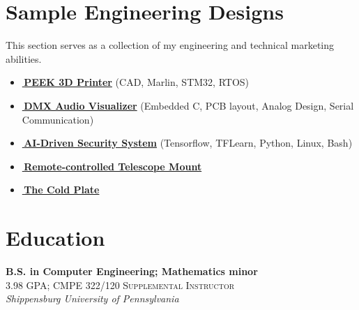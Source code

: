 \documentclass[
	12pt, %
]{FreemanCV}
\begin{document}

\vspace*{-10pt}
\section{Sample Engineering Designs}
{
	This section serves as a collection of my engineering and technical marketing abilities.
	\vspace*{-7pt}
	\begin{itemize}[leftmargin=10pt]
		\itemsep-5pt
		\item \href{https://github.com/jfcbooth/3dpp}{\linkcolor\scriptsize\faLink\normalcolor\normalsize\,\textbf{PEEK 3D Printer}} (CAD, Marlin, STM32, RTOS)
		\item \href{https://github.com/microchip-pic-avr-examples/pic16f56q71-audio-light-show-mplab-mcc}{\linkcolor\scriptsize\faLink\normalcolor\normalsize\,\textbf{DMX Audio Visualizer}} (Embedded C, PCB layout, Analog Design, Serial Communication)
		\item \href{https://github.com/jfcbooth/security_system}{\linkcolor\scriptsize\faLink\normalcolor\normalsize\,\textbf{AI-Driven Security System}} (Tensorflow, TFLearn, Python, Linux, Bash)
		\item \href{https://github.com/jfcbooth/hadley_electric_stand}{\linkcolor\scriptsize\faLink\normalcolor\normalsize\,\textbf{Remote-controlled Telescope Mount}}
		\item \href{https://github.com/microchip-pic-avr-examples/pic16f17146-cold-plate-mplab-mcc}{\linkcolor\scriptsize\faLink\normalcolor\normalsize\,\textbf{The Cold Plate}}
	\end{itemize}
}

\section{Education}
	\textbf{B.S. in Computer Engineering; Mathematics minor}\\ %
	\small\textsc{3.98 GPA; CMPE 322/120 Supplemental Instructor}\\ %
	\textit{Shippensburg University of Pennsylvania}\\ %
\end{document}
